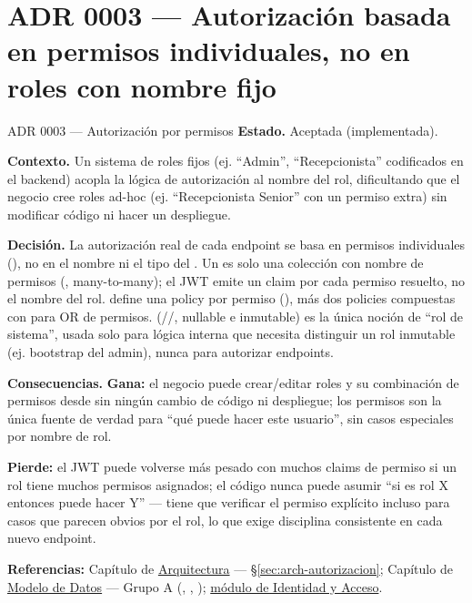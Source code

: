\section{ADR 0003 --- Autorización basada en permisos individuales, no en roles con nombre fijo}
\label{adr:0003}

\begin{cajaADR}{ADR 0003 --- Autorización por permisos}
\textbf{Estado.} Aceptada (implementada).

\textbf{Contexto.} Un sistema de roles fijos (ej. ``Admin'', ``Recepcionista'' codificados en el backend) acopla la lógica de autorización al nombre del rol, dificultando que el negocio cree roles ad-hoc (ej. ``Recepcionista Senior'' con un permiso extra) sin modificar código ni hacer un despliegue.

\textbf{Decisión.} La autorización real de cada endpoint se basa en permisos individuales (), no en el nombre ni el tipo del . Un  es solo una colección con nombre de permisos (, many-to-many); el JWT emite un claim  por cada permiso resuelto, no el nombre del rol.  define una policy por permiso (), más dos policies compuestas con  para OR de permisos.  (//, nullable e inmutable) es la única noción de ``rol de sistema'', usada solo para lógica interna que necesita distinguir un rol inmutable (ej. bootstrap del admin), nunca para autorizar endpoints.

\textbf{Consecuencias.} \textbf{Gana:} el negocio puede crear/editar roles y su combinación de permisos desde  sin ningún cambio de código ni despliegue; los permisos son la única fuente de verdad para ``qué puede hacer este usuario'', sin casos especiales por nombre de rol.

\textbf{Pierde:} el JWT puede volverse más pesado con muchos claims de permiso si un rol tiene muchos permisos asignados; el código nunca puede asumir ``si es rol X entonces puede hacer Y'' --- tiene que verificar el permiso explícito incluso para casos que parecen obvios por el rol, lo que exige disciplina consistente en cada nuevo endpoint.
\end{cajaADR}

\textbf{Referencias:} Capítulo de \hyperref[sec:arch-autorizacion]{Arquitectura} --- \S\ref{sec:arch-autorizacion}; Capítulo de \hyperref[sec:modelo-datos]{Modelo de Datos} --- Grupo A (, , ); \hyperref[mod:01-identidad-y-acceso]{módulo de Identidad y Acceso}.

